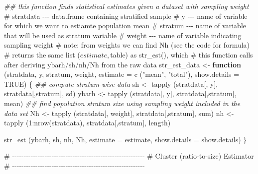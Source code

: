 \documentclass[
  letterpaper,
  DIV=11,
  numbers=noendperiod]{scrreprt}
\newenvironment{Shaded}{\begin{snugshade}}{\end{snugshade}}
\newcommand{\AttributeTok}[1]{\textcolor[rgb]{0.40,0.45,0.13}{#1}}
\newcommand{\CommentTok}[1]{\textcolor[rgb]{0.37,0.37,0.37}{#1}}
\newcommand{\ConstantTok}[1]{\textcolor[rgb]{0.56,0.35,0.01}{#1}}
\newcommand{\ControlFlowTok}[1]{\textcolor[rgb]{0.00,0.23,0.31}{\textbf{#1}}}
\newcommand{\DecValTok}[1]{\textcolor[rgb]{0.68,0.00,0.00}{#1}}
\newcommand{\DocumentationTok}[1]{\textcolor[rgb]{0.37,0.37,0.37}{\textit{#1}}}
\newcommand{\FunctionTok}[1]{\textcolor[rgb]{0.28,0.35,0.67}{#1}}
\newcommand{\NormalTok}[1]{\textcolor[rgb]{0.00,0.23,0.31}{#1}}
\newcommand{\OtherTok}[1]{\textcolor[rgb]{0.00,0.23,0.31}{#1}}
\newcommand{\SpecialCharTok}[1]{\textcolor[rgb]{0.37,0.37,0.37}{#1}}
\newcommand{\StringTok}[1]{\textcolor[rgb]{0.13,0.47,0.30}{#1}}
\renewcommand{\[}{\begin{equation}}
\renewcommand{\]}{\end{equation}}
\begin{document}
\begin{Shaded}
\begin{Highlighting}[]
\DocumentationTok{\#\# this function finds statistical estimates given a dataset with sampling weight}
\CommentTok{\# stratdata {-}{-}{-} data.frame containing stratified sample}
\CommentTok{\# y {-}{-}{-} name of variable for which we want to estiamte population mean}
\CommentTok{\# stratum {-}{-}{-} name of variable that will be used as stratum variable}
\CommentTok{\# weight {-}{-}{-} name of variable indicating sampling weight}
\CommentTok{\# note: from weights we can find Nh (see the code for formula)}
\CommentTok{\# returns the same list ($estimate, $table) as str\_est(), which}
\CommentTok{\# this function calls after deriving ybarh/sh/nh/Nh from the raw data}
\NormalTok{str\_est\_data }\OtherTok{\textless{}{-}} \ControlFlowTok{function}\NormalTok{ (stratdata, y, stratum, weight, }\AttributeTok{estimate =} \FunctionTok{c}\NormalTok{ (}\StringTok{"mean"}\NormalTok{, }\StringTok{"total"}\NormalTok{), }\AttributeTok{show.details =} \ConstantTok{TRUE}\NormalTok{)}
\NormalTok{\{}
    \DocumentationTok{\#\# compute stratum{-}wise data}
\NormalTok{    sh }\OtherTok{\textless{}{-}} \FunctionTok{tapply}\NormalTok{ (stratdata[, y], stratdata[,stratum], sd)}
\NormalTok{    ybarh }\OtherTok{\textless{}{-}} \FunctionTok{tapply}\NormalTok{ (stratdata[, y], stratdata[,stratum], mean)}
    \DocumentationTok{\#\# find population stratum size using sampling weight included in the data set}
\NormalTok{    Nh }\OtherTok{\textless{}{-}} \FunctionTok{tapply}\NormalTok{ (stratdata[, weight], stratdata[,stratum], sum)}
\NormalTok{    nh }\OtherTok{\textless{}{-}} \FunctionTok{tapply}\NormalTok{ (}\DecValTok{1}\SpecialCharTok{:}\FunctionTok{nrow}\NormalTok{(stratdata), stratdata[,stratum], length)}

    \FunctionTok{str\_est}\NormalTok{ (ybarh, sh, nh, Nh, }\AttributeTok{estimate =}\NormalTok{ estimate, }\AttributeTok{show.details =}\NormalTok{ show.details)}
\NormalTok{\}}

\CommentTok{\# {-}{-}{-}{-}{-}{-}{-}{-}{-}{-}{-}{-}{-}{-}{-}{-}{-}{-}{-}{-}{-}{-}{-}{-}{-}{-}{-}{-}{-}{-}{-}{-}{-}{-}{-}{-}{-}{-}{-}{-}{-}{-}{-}{-}{-}{-}{-}{-}{-}{-}{-}{-}{-}{-}{-}{-}{-}}
\CommentTok{\# Cluster (ratio{-}to{-}size) Estimator}
\CommentTok{\# {-}{-}{-}{-}{-}{-}{-}{-}{-}{-}{-}{-}{-}{-}{-}{-}{-}{-}{-}{-}{-}{-}{-}{-}{-}{-}{-}{-}{-}{-}{-}{-}{-}{-}{-}{-}{-}{-}{-}{-}{-}{-}{-}{-}{-}{-}{-}{-}{-}{-}{-}{-}{-}{-}{-}{-}{-}}


\end{Highlighting}
\end{Shaded}
\end{document}
